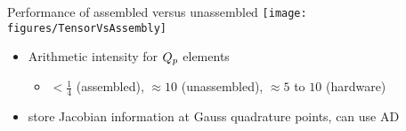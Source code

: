 \begin{frame}[shrink=5]{Performance of assembled versus unassembled}
  \vspace{1ex}
  \texttt{[image: figures/TensorVsAssembly]} \\
  \begin{itemize}
  \item Arithmetic intensity for $Q_{p}$ elements
    \begin{itemize}
    \item $< \frac 1 4$ (assembled), $\approx 10$ (unassembled), $\approx 5$ to $10$ (hardware)
    \end{itemize}
  \item store Jacobian information at Gauss quadrature points, can use AD
  \end{itemize}
\end{frame}
